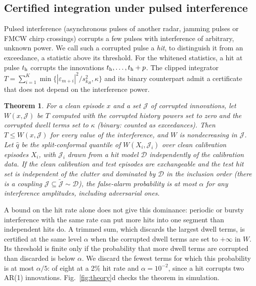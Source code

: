 \documentclass[journal]{IEEEtran}
\newtheorem{theorem}{Theorem}
\begin{document}
\subsection{Certified integration under pulsed interference}\label{sec:certsec}
Pulsed interference (asynchronous pulses of another radar, jamming pulses or FMCW chirp crossings) corrupts a few pulses with interference of arbitrary, unknown power. We call such a corrupted pulse a \emph{hit}, to distinguish it from an exceedance, a statistic above its threshold. For the whitened statistics, a hit at pulse $t_{\rm h}$ corrupts the innovations $t_{\rm h},\dots,t_{\rm h}+p$. The clipped integrator $T=\sum_{i=1}^K\min\{|\varepsilon_{m+i}|^2/s_{k_H}^2,\kappa\}$ and its binary counterpart admit a certificate that does not depend on the interference power.
\begin{theorem}\label{thm:cert}
For a clean episode $x$ and a set $\mathcal J$ of corrupted innovations, let $W(x,\mathcal J)$ be $T$ computed with the corrupted history powers set to zero and the corrupted dwell terms set to $\kappa$ (binary: counted as exceedances). Then $T\le W(x,\mathcal J)$ for every value of the interference, and $W$ is nondecreasing in $\mathcal J$. Let $\widehat q$ be the split-conformal quantile of $W(X_i,\mathcal J_i)$ over clean calibration episodes $X_i$, with $\mathcal J_i$ drawn from a hit model $\mathcal D$ independently of the calibration data. If the clean calibration and test episodes are exchangeable and the test hit set is independent of the clutter and dominated by $\mathcal D$ in the inclusion order (there is a coupling $\mathcal J\subseteq\tilde{\mathcal J}\sim\mathcal D$), the false-alarm probability is at most $\alpha$ for any interference amplitudes, including adversarial ones.
\end{theorem}
A bound on the hit rate alone does not give this dominance: periodic or bursty interference with the same rate can put more hits into one segment than independent hits do. A trimmed sum, which discards the largest dwell terms, is certified at the same level $\alpha$ when the corrupted dwell terms are set to $+\infty$ in $W$. Its threshold is finite only if the probability that more dwell terms are corrupted than discarded is below $\alpha$. We discard the fewest terms for which this probability is at most $\alpha/5$: \TrimTwo{} of eight at a 2\% hit rate and $\alpha=10^{-2}$, since a hit corrupts two AR(1) innovations. Fig.~\ref{fig:theory}d checks the theorem in simulation.
\end{document}
